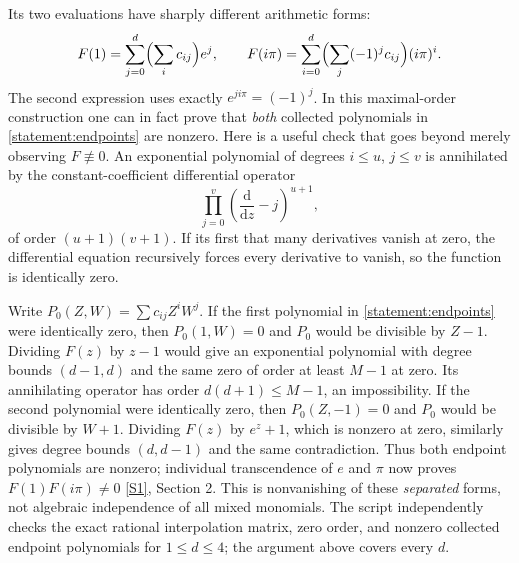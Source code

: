 \documentclass[11pt,a4paper]{article}
\newcommand{\sref}[2]{\hyperlink{source:#1:#2}{[S#2]}}
\numberwithin{equation}{section}
\begin{document}
Its two evaluations have sharply different arithmetic forms:
\begin{equation}\label{statement:endpoints}
 F(1)=\sum_{j=0}^d\Bigl(\sum_i c_{ij}\Bigr)e^j,
 \qquad
 F(i\pi)=\sum_{i=0}^d\Bigl(\sum_j(-1)^jc_{ij}\Bigr)(i\pi)^i.
\end{equation}
The second expression uses exactly $e^{ji\pi}=(-1)^j$. In this
maximal-order construction one can in fact prove that \emph{both}
collected polynomials in \eqref{statement:endpoints} are nonzero. Here is a
useful check that goes beyond merely observing $F\not\equiv0$.
An exponential polynomial of degrees $i\le u$, $j\le v$ is annihilated
by the constant-coefficient differential operator
\begin{equation}
 \prod_{j=0}^v\left(\frac{\mathrm d}{\mathrm dz}-j\right)^{u+1},
\end{equation}
of order $(u+1)(v+1)$. If its first that many derivatives vanish at
zero, the differential equation recursively forces every derivative
to vanish, so the function is identically zero.

Write $P_0(Z,W)=\sum c_{ij}Z^iW^j$. If the first polynomial in
\eqref{statement:endpoints} were identically zero, then $P_0(1,W)=0$ and
$P_0$ would be divisible by $Z-1$. Dividing $F(z)$ by $z-1$ would give
an exponential polynomial with degree bounds $(d-1,d)$ and the same
zero of order at least $M-1$ at zero. Its annihilating operator has
order $d(d+1)\le M-1$, an impossibility. If the second polynomial were
identically zero, then $P_0(Z,-1)=0$ and $P_0$ would be divisible by
$W+1$. Dividing $F(z)$ by $e^z+1$, which is nonzero at zero, similarly
gives degree bounds $(d,d-1)$ and the same contradiction. Thus both
endpoint polynomials are nonzero; individual transcendence of $e$ and
$\pi$ now proves $F(1)F(i\pi)\ne0$ \sref{statement}{1}, Section 2.
This is nonvanishing of these \emph{separated} forms, not algebraic
independence of all mixed monomials. The script independently checks
the exact rational interpolation matrix, zero order, and nonzero
collected endpoint polynomials for $1\le d\le4$; the argument above
covers every $d$.
\end{document}
